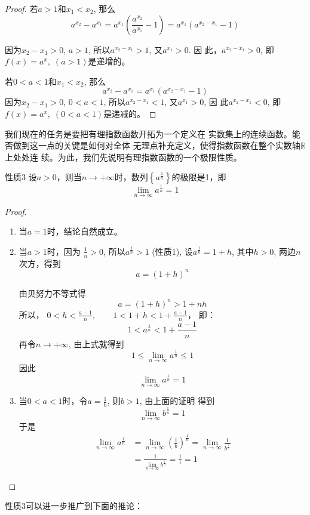 \begin{proof}
  若$a>1$和$x_1<x_2$, 那么
\[a^{x_2}-a^{x_1}=a^{x_1}\left(\frac{a^{x_2}}{a^{x_1}}-1\right)=a^{x_1}\left(a^{x_2-x_1}-1\right)\]
  
因为$x_2-x_1>0$, $a>1$, 所以$a^{x_2-x_1}>1$, 又$a^{x_1}>0$. 因
此，$a^{x_2-x_1}>0$, 即$f(x)=a^x,\; (a>1)$是递增的。

若$0<a<1$和$x_1<x_2$, 那么
\[a^{x_2}-a^{x_1}=a^{x_1}\left(a^{x_2-x_1}-1\right)\]
因为$x_2-x_1>0$, $0<a<1$, 所以$a^{x_2-x_1}<1$, 又$a^{x_1}>0$, 因
此$a^{x_2-x_1}<0$, 即$f(x)=a^x,\; (0<a<1)$是递减的。
\end{proof}

我们现在的任务是要把有理指数函数开拓为一个定义在
实数集上的连续函数。能否做到这一点的关键是如何对全体
无理点补充定义，使得指数函数在整个实数轴$\mathbb{R}$上处处连
续。为此，我们先说明有理指数函数的一个极限性质。


\begin{blk}{性质3}
  设$a>0$，则当$n\to +\infty$时，数列$\left\{a^{\tfrac{1}{n}}\right\}$的极限是1，即
  \[\lim_{n\to\infty}a^{\tfrac{1}{n}}=1\]
\end{blk}

\begin{proof}
\begin{enumerate}
  \item 当$a=1$时，结论自然成立。
  \item 当$a>1$时，因为
  $\frac{1}{n}>0$, 所以$a^{\tfrac{1}{n}}>1$ (性质1),
  设$a^{\tfrac{1}{n}}=1+h$, 其中$h>0$, 两边$n$次方，得到
 \[ a=(1+h)^n\]
 
 由贝努力不等式得
\[  a=(1+h)^n>1+nh\]
  所以，
$  0<h<\frac{a-1}{n},\qquad 1<1+h<1+\frac{a-1}{n}$，
  即：
\[1<a^{\tfrac{1}{n}}<1+\frac{a-1}{n}\]  
  再令$n\to +\infty$, 由上式就得到
\[1\le \lim_{n\to\infty}a^{\tfrac{1}{n}}\le 1 \]
  因此\[\lim_{n\to\infty}a^{\tfrac{1}{n}}=1\]
  \item 当$0<a<1$时，令$a=\frac{1}{b}$, 则$b>1$, 由上面的证明
  得到\[\lim_{n\to\infty}b^{\tfrac{1}{n}}=1\]
于是
\[\begin{split}
  \lim_{n\to\infty}a^{\tfrac{1}{n}}&=\lim_{n\to\infty}\left(\frac{1}{b}\right)^{\tfrac{1}{n}}=\lim_{n\to\infty}\frac{1}{b^{\tfrac{1}{n}}}\\
  &=\frac{1}{\displaystyle\lim_{n\to\infty}b^{\tfrac{1}{n}}}=\frac{1}{1}=1
\end{split}\]
\end{enumerate} 
\end{proof}

性质3可以进一步推广到下面的推论：

